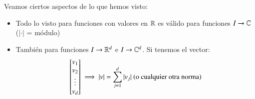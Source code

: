 \begin{obs}
    Veamos ciertos aspectos de lo que hemos visto:
    \begin{itemize}
    \item Todo lo visto para funciones con valores en $\mathbb{R}$ es válido para funciones $I \to \mathbb{C}$ ($| \cdot |$ = módulo)\\
    \item También para funciones $I \to \mathbb{R}^d$ e $I \to \mathbb{C}^d$. Si tenemos el vector:
    $$
        \mx{v_1\\v_2\\\vdots\\v_d} \implies |v| = \sum_{j=1}^d |v_j| \text{ (o cualquier otra norma)}
    $$
    \end{itemize}

\end{obs}

